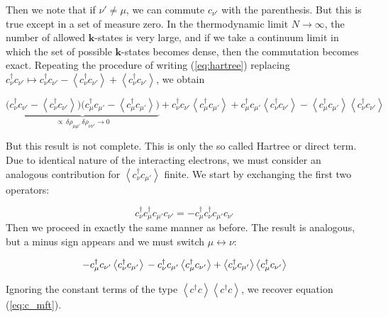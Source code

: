 Then we note that if $\nu' \neq \mu$, we can commute $c_{\nu'}$ with the parenthesis. But this is true except in a set of measure zero. In the thermodynamic limit $N \rightarrow \infty$, the number of allowed $\bm k$-states is very large, and if we take a continuum limit in which the set of possible $\bm k$-states becomes dense, then the commutation becomes exact. Repeating the procedure of writing (\ref{eq:hartree}) replacing $c_\nu^\dagger c_{\nu'} \mapsto c_\nu^\dagger c_{\nu'} - \left\langle c_\nu^\dagger c_{\nu'} \right\rangle + \left\langle c_\nu^\dagger c_{\nu'} \right\rangle $, we obtain

\begin{equation}\label{eq:mf}
\underbrace{\big( c_\nu^\dagger c_{\nu'} - \left\langle c_\nu^\dagger c_{\nu'} \right\rangle \big) \big( c_\mu^\dagger c_{\mu'} - \left\langle c_\mu^\dagger c_{\mu'} \right\rangle \big)}_{\propto \, \delta \rho_{\mu\mu'} \, \delta \rho_{\nu\nu'} \rightarrow 0} + c_\nu^\dagger c_{\nu'} \left\langle c_\mu^\dagger c_{\mu'} \right\rangle + c_\mu^\dagger c_{\mu'} \left\langle c_\nu^\dagger c_{\nu'} \right\rangle - \left\langle c_\mu^\dagger c_{\mu'} \right\rangle \left\langle c_\nu^\dagger c_{\nu'} \right\rangle
\end{equation}

But this result is not complete. This is only the so called Hartree or direct term. Due to identical nature of the interacting electrons, we must consider an analogous contribution for $\left\langle c_\nu^\dagger c_{\mu'} \right\rangle$ finite. We start by exchanging the first two operators: 

\begin{equation}
c_\nu^\dagger c_\mu^\dagger c_{\mu'} c_{\nu'} = - c_\mu^\dagger c_\nu^\dagger c_{\mu'} c_{\nu'}
\end{equation}
Then we proceed in exactly the same manner as before. The result is analogous, but a minus sign appears and we must switch $\mu \leftrightarrow \nu$:

\begin{equation}
- c_\mu^\dagger c_{\nu'} \left\langle c_\nu^\dagger c_{\mu'} \right\rangle \\
- c_\nu^\dagger c_{\mu'} \left\langle c_\mu^\dagger c_{\nu'} \right\rangle + \left\langle c_\nu^\dagger c_{\mu'} \right\rangle \left\langle c_\mu^\dagger c_{\nu'} \right\rangle
\end{equation}

Ignoring the constant terms of the type $\left\langle c^\dagger c \right\rangle \left\langle c^\dagger c \right\rangle$, we recover equation (\ref{eq:c_mft}).

